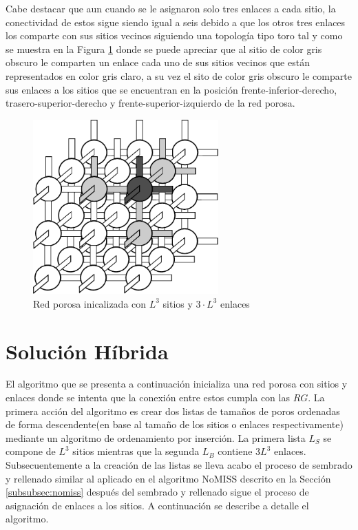 Cabe destacar que aun cuando se le asignaron solo tres enlaces a cada sitio, la conectividad de estos sigue siendo igual a seis debido a que los otros tres enlaces los comparte con sus sitios vecinos siguiendo una topología tipo toro tal y como se muestra en la Figura \ref{fig:redinit} donde se puede apreciar que al sitio de color gris obscuro le comparten un enlace cada uno de sus sitios vecinos que están representados en color gris claro, a su vez el sito de color gris obscuro le comparte sus enlaces a los sitios que se encuentran en la posición frente-inferior-derecho, trasero-superior-derecho y frente-superior-izquierdo de la red porosa.


\begin{figure}[hbtp]
\centering
\includegraphics[width=2.8in]{img/red2.pdf}
\caption{Red porosa inicalizada con $L^3$ sitios y $3 \cdot L^3$ enlaces}
\label{fig:redinit}
\end{figure}

\section{Solución Híbrida}
\label{sec:hybrid}
El algoritmo que se presenta a continuación inicializa una red porosa con sitios y enlaces donde se intenta que la conexi\'on entre estos cumpla con las $RG$. La primera acción del algoritmo es crear dos listas de tamaños de poros ordenadas de forma descendente(en base al tamaño de los sitios o enlaces respectivamente) mediante un algoritmo de ordenamiento por inserción. La primera lista $L_S$ se compone de $L^3$ sitios mientras que la segunda $L_B$ contiene $3L^3$ enlaces. Subsecuentemente a la creaci\'on de  las listas se lleva acabo el proceso de sembrado y rellenado similar al aplicado en el algoritmo NoMISS descrito en la Sección \ref{subsubsec:nomiss} después del sembrado y rellenado sigue el proceso de asignación de enlaces a los sitios. A continuación se describe a detalle el algoritmo.

